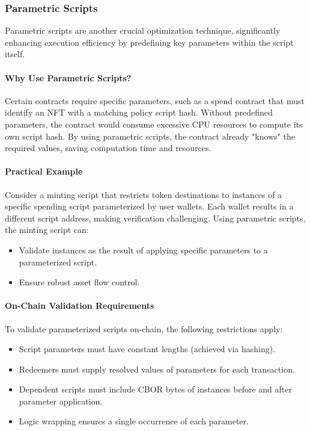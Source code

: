 \subsubsection{Parametric Scripts}

Parametric scripts are another crucial optimization technique, significantly enhancing execution efficiency by predefining key parameters within the script itself.

\paragraph{Why Use Parametric Scripts?}

Certain contracts require specific parameters, such as a spend contract that must identify an NFT with a matching policy script hash. Without predefined parameters, the contract would consume excessive CPU resources to compute its own script hash. By using parametric scripts, the contract already "knows" the required values, saving computation time and resources.

\paragraph{Practical Example}

Consider a minting script that restricts token destinations to instances of a specific spending script parameterized by user wallets. Each wallet results in a different script address, making verification challenging. Using parametric scripts, the minting script can:
\begin{itemize}
    \item Validate instances as the result of applying specific parameters to a parameterized script.
    \item Ensure robust asset flow control.
\end{itemize}

\paragraph{On-Chain Validation Requirements}

To validate parameterized scripts on-chain, the following restrictions apply:
\begin{itemize}
    \item Script parameters must have constant lengths (achieved via hashing).
    \item Redeemers must supply resolved values of parameters for each transaction.
    \item Dependent scripts must include CBOR bytes of instances before and after parameter application.
    \item Logic wrapping ensures a single occurrence of each parameter.
\end{itemize}


